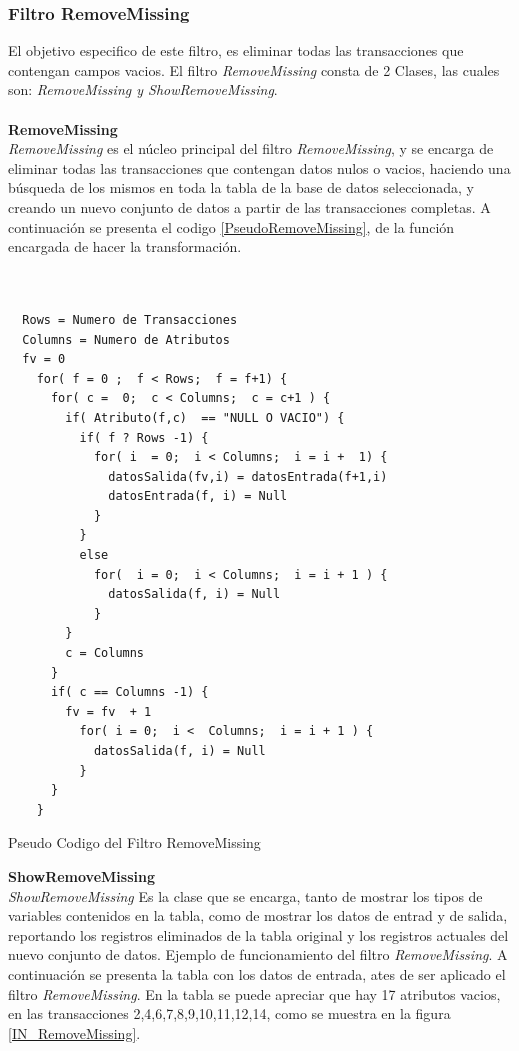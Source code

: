 \subsubsection{Filtro RemoveMissing}
El objetivo especifico de este filtro, es eliminar todas las transacciones que contengan  campos vacios.
El filtro \textit{RemoveMissing}  consta de 2 Clases, las cuales son: \textit{RemoveMissing y  ShowRemoveMissing}. \\ \\
\textbf{RemoveMissing} \\ 
\textit{RemoveMissing} es el n\'ucleo principal del filtro \textit{RemoveMissing}, y se encarga de eliminar todas las transacciones que contengan datos nulos o vacios, haciendo una b\'usqueda de los mismos en toda la tabla de la base de datos seleccionada, y creando un nuevo conjunto de datos a partir de las transacciones completas.
A continuaci\'on se presenta el codigo \ref{PseudoRemoveMissing}, de la funci\'on encargada de hacer  la transformaci\'on. \\ \\ \\

\begin{codigof}[t]
\begin{verbatim}
  Rows = Numero de Transacciones
  Columns = Numero de Atributos
  fv = 0
    for( f = 0 ;  f < Rows;  f = f+1) {
      for( c =  0;  c < Columns;  c = c+1 ) {
        if( Atributo(f,c)  == "NULL O VACIO") { 
          if( f ? Rows -1) {
            for( i  = 0;  i < Columns;  i = i +  1) { 
              datosSalida(fv,i) = datosEntrada(f+1,i)
              datosEntrada(f, i) = Null
            }
          }   
          else
            for(  i = 0;  i < Columns;  i = i + 1 ) {
              datosSalida(f, i) = Null
            }
        }
        c = Columns
      }
      if( c == Columns -1) {
        fv = fv  + 1
          for( i = 0;  i <  Columns;  i = i + 1 ) {
            datosSalida(f, i) = Null
          }
      }
    }
\end{verbatim}
\caption{Pseudo Codigo del Filtro RemoveMissing}
\label{PseudoRemoveMissing}
\end{codigof} 

\textbf{ShowRemoveMissing}\\ 
\textit{ShowRemoveMissing} Es la clase que se encarga, tanto de mostrar los tipos de variables contenidos en la tabla, como de mostrar los datos de entrad y de salida, reportando los registros eliminados de la tabla original y los registros actuales del nuevo conjunto de datos.
Ejemplo de funcionamiento del filtro \textit{RemoveMissing}.
A continuaci\'on se presenta la tabla con los datos de entrada, ates de ser aplicado el filtro \textit{RemoveMissing}.  En la tabla se puede apreciar que hay 17 atributos vacios, en las transacciones  2,4,6,7,8,9,10,11,12,14, como se muestra en la figura \ref{IN_RemoveMissing}.\\ 

